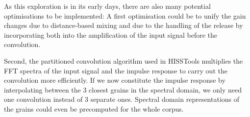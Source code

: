 As this exploration is in its early days, there are also many potential optimisations to be implemented:
%
A first optimisation could be to unify the gain changes due to distance-based mixing and due to the handling of the release by incorporating both into the amplification of the input signal before the convolution.

Second, the partitioned convolution algorithm used in HISSTools multiplies the FFT spectra of the input signal and the impulse response to carry out the convolution more efficiently.  If we now constitute the impulse response by interpolating between the 3 closest grains in the spectral domain, we only need one convolution instead of 3 separate ones.  Spectral domain representations of the grains could even be precomputed for the whole corpus. %



